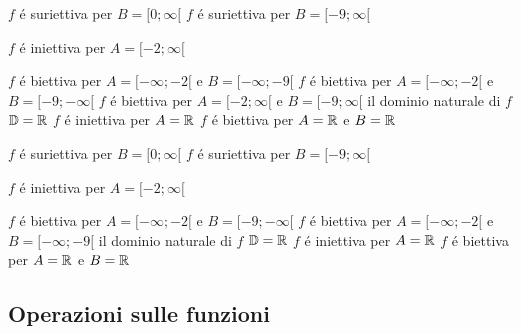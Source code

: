 \begin{questions}
\question
{}

\begin{checkboxes}

\choice $f$ é suriettiva per $B=[0;\infty[$
\CorrectChoice $f$ é suriettiva per $B=[-9;\infty[$

\CorrectChoice $f$ é iniettiva per $A=[-2;\infty[$

\choice $f$ é biettiva per $A=[-\infty;-2[$ e $B=[-\infty;-9[$
\CorrectChoice $f$ é biettiva per $A=[-\infty;-2[$ e $B=[-9;-\infty[$
\CorrectChoice $f$ é biettiva per $A=[-2;\infty[$ e $B=[-9;\infty[$
\CorrectChoice il dominio naturale di $f$ $\mathbb{D}=\mathbb{R}$
\choice $f$ é iniettiva per $A=\mathbb{R}$
\choice $f$ é biettiva per $A=\mathbb{R}$ e $B=\mathbb{R}$

\end{checkboxes}

\question
{}

\begin{checkboxes}

\CorrectChoice $f$ é suriettiva per $B=[0;\infty[$
\CorrectChoice $f$ é suriettiva per $B=[-9;\infty[$

\CorrectChoice $f$ é iniettiva per $A=[-2;\infty[$

\choice $f$ é biettiva per $A=[-\infty;-2[$ e $B=[-9;-\infty[$
\CorrectChoice $f$ é biettiva per $A=[-\infty;-2[$ e $B=[-\infty;-9[$
\CorrectChoice il dominio naturale di $f$ $\mathbb{D}=\mathbb{R}$
\CorrectChoice $f$ é iniettiva per $A=\mathbb{R}$
\CorrectChoice $f$ é biettiva per $A=\mathbb{R}$ e $B=\mathbb{R}$

\end{checkboxes}
\end{questions}

\subsection{Operazioni sulle funzioni}


